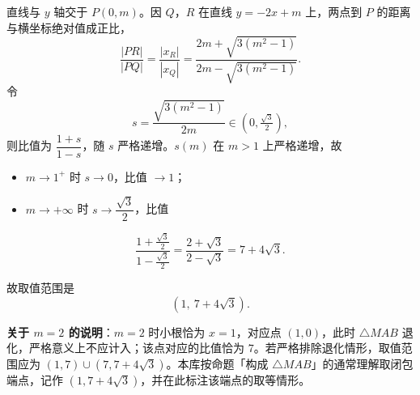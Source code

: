 \begin{answer}
直线与 $y$ 轴交于 $P(0,m)$。因 $Q$，$R$ 在直线 $y=-2x+m$ 上，两点到 $P$ 的距离与横坐标绝对值成正比，
\nopagebreak[4]
\[\frac{|PR|}{|PQ|}=\frac{\left|x_R\right|}{\left|x_Q\right|}=\frac{2m+\sqrt{3\left(m^2-1\right)}}{2m-\sqrt{3\left(m^2-1\right)}}.\]
令
\nopagebreak[4]
\[s=\frac{\sqrt{3\left(m^2-1\right)}}{2m}\in(0,\tfrac{\sqrt3}2),\]
则比值为 $\dfrac{1+s}{1-s}$，随 $s$ 严格递增。$s(m)$ 在 $m>1$ 上严格递增，故

\begin{itemize}
\item $m\to1^+$ 时 $s\to0$，比值 $\to1$；
\item $m\to+\infty$ 时 $s\to\dfrac{\sqrt3}2$，比值
\end{itemize}
\nopagebreak[4]
\[\frac{1+\frac{\sqrt3}2}{1-\frac{\sqrt3}2}=\frac{2+\sqrt3}{2-\sqrt3}=7+4\sqrt3.\]

故取值范围是
\nopagebreak[4]
\[\left(1,\ 7+4\sqrt3\right).\]

\textbf{关于 $m=2$ 的说明}：$m=2$ 时小根恰为 $x=1$，对应点 $(1,0)$，此时 $\triangle MAB$ 退化，严格意义上不应计入；该点对应的比值恰为 $7$。若严格排除退化情形，取值范围应为 $\left(1,7\right)\cup\left(7,7+4\sqrt3\right)$。本库按命题「构成 $\triangle MAB$」的通常理解取闭包端点，记作 $\left(1,7+4\sqrt3\right)$，并在此标注该端点的取等情形。



\end{answer}
